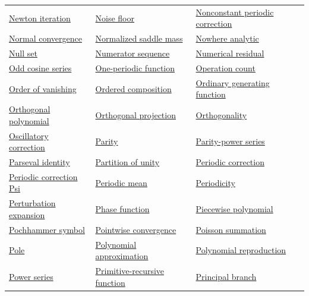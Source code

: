 \documentclass[11pt,oneside]{article}
\begin{document}
\begin{longtable}{p{}p{}p{}}
\hyperlink{gls:newton-iteration}{Newton iteration} & \hyperlink{gls:noise-floor}{Noise floor} & \hyperlink{gls:nonconstant-periodic-correction}{Nonconstant periodic correction} \\
\hyperlink{gls:normal-convergence}{Normal convergence} & \hyperlink{gls:normalized-saddle-mass}{Normalized saddle mass} & \hyperlink{gls:nowhere-analytic}{Nowhere analytic} \\
\hyperlink{gls:null-set}{Null set} & \hyperlink{gls:numerator-sequence}{Numerator sequence} & \hyperlink{gls:numerical-residual}{Numerical residual} \\
\hyperlink{gls:odd-cosine-series}{Odd cosine series} & \hyperlink{gls:one-periodic-function}{One-periodic function} & \hyperlink{gls:operation-count}{Operation count} \\
\hyperlink{gls:order-of-vanishing}{Order of vanishing} & \hyperlink{gls:ordered-composition}{Ordered composition} & \hyperlink{gls:ordinary-generating-function}{Ordinary generating function} \\
\hyperlink{gls:orthogonal-polynomial}{Orthogonal polynomial} & \hyperlink{gls:orthogonal-projection}{Orthogonal projection} & \hyperlink{gls:orthogonality}{Orthogonality} \\
\hyperlink{gls:oscillatory-correction}{Oscillatory correction} & \hyperlink{gls:parity}{Parity} & \hyperlink{gls:parity-power-series}{Parity-power series} \\
\hyperlink{gls:parseval-identity}{Parseval identity} & \hyperlink{gls:partition-of-unity}{Partition of unity} & \hyperlink{gls:periodic-correction}{Periodic correction} \\
\hyperlink{gls:periodic-correction-psi}{Periodic correction Psi} & \hyperlink{gls:periodic-mean}{Periodic mean} & \hyperlink{gls:periodicity}{Periodicity} \\
\hyperlink{gls:perturbation-expansion}{Perturbation expansion} & \hyperlink{gls:phase-function}{Phase function} & \hyperlink{gls:piecewise-polynomial}{Piecewise polynomial} \\
\hyperlink{gls:pochhammer-symbol}{Pochhammer symbol} & \hyperlink{gls:pointwise-convergence}{Pointwise convergence} & \hyperlink{gls:poisson-summation}{Poisson summation} \\
\hyperlink{gls:pole}{Pole} & \hyperlink{gls:polynomial-approximation}{Polynomial approximation} & \hyperlink{gls:polynomial-reproduction}{Polynomial reproduction} \\
\hyperlink{gls:power-series}{Power series} & \hyperlink{gls:primitive-recursive-function}{Primitive-recursive function} & \hyperlink{gls:principal-branch}{Principal branch} \\

\end{longtable}
\end{document}
